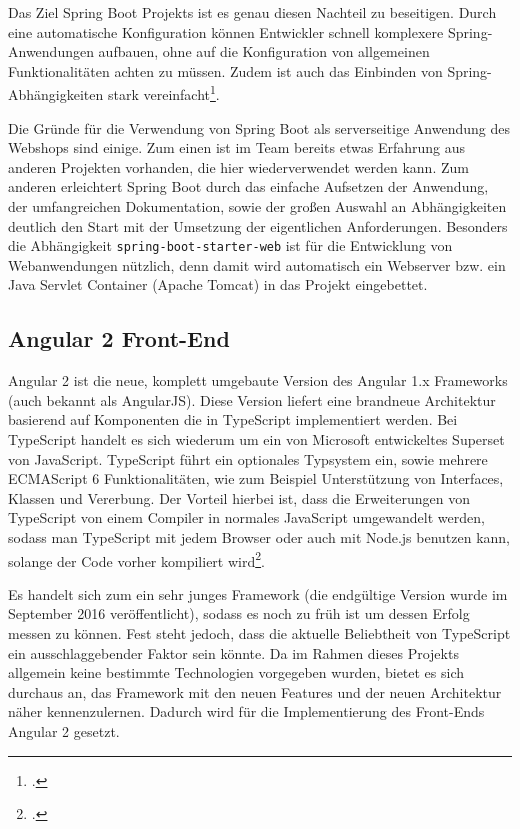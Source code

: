 Das Ziel Spring Boot Projekts ist es genau diesen Nachteil zu beseitigen. Durch eine automatische Konfiguration können Entwickler schnell komplexere Spring-Anwendungen aufbauen, ohne auf die Konfiguration von allgemeinen Funktionalitäten achten zu müssen. Zudem ist auch das Einbinden von Spring-Abhängigkeiten stark vereinfacht\footcite[Vgl.][]{Webb2013}.

Die Gründe für die Verwendung von Spring Boot als serverseitige Anwendung des Webshops sind einige. Zum einen ist im Team bereits etwas Erfahrung aus anderen Projekten vorhanden, die hier wiederverwendet werden kann. Zum anderen erleichtert Spring Boot durch das einfache Aufsetzen der Anwendung, der umfangreichen Dokumentation, sowie der großen Auswahl an Abhängigkeiten deutlich den Start mit der Umsetzung der eigentlichen Anforderungen. Besonders die Abhängigkeit \texttt{spring-boot-starter-web} ist für die Entwicklung von Webanwendungen nützlich, denn damit wird automatisch ein Webserver bzw. ein Java Servlet Container (Apache Tomcat) in das Projekt eingebettet.

\subsection{Angular 2 Front-End}

Angular 2 ist die neue, komplett umgebaute Version des Angular 1.x Frameworks (auch bekannt als AngularJS). Diese Version liefert eine brandneue Architektur basierend auf Komponenten die in TypeScript implementiert werden. Bei TypeScript handelt es sich wiederum um ein von Microsoft entwickeltes Superset von JavaScript. TypeScript führt ein optionales Typsystem ein, sowie mehrere ECMAScript 6 Funktionalitäten, wie zum Beispiel Unterstützung von Interfaces, Klassen und Vererbung. Der Vorteil hierbei ist, dass die Erweiterungen von TypeScript von einem Compiler in normales JavaScript umgewandelt werden, sodass man TypeScript mit jedem Browser oder auch mit Node.js benutzen kann, solange der Code vorher kompiliert wird\footcite[Vgl.][S. 33]{Deeleman2016}. 

Es handelt sich zum ein sehr junges Framework (die endgültige Version wurde im September 2016 veröffentlicht), sodass es noch zu früh ist um dessen Erfolg messen zu können. Fest steht jedoch, dass die aktuelle Beliebtheit von TypeScript ein ausschlaggebender Faktor sein könnte. Da im Rahmen dieses Projekts allgemein keine bestimmte Technologien vorgegeben wurden, bietet es sich durchaus an, das Framework mit den neuen Features und der neuen Architektur näher kennenzulernen. Dadurch wird für die Implementierung des Front-Ends Angular 2 gesetzt.

